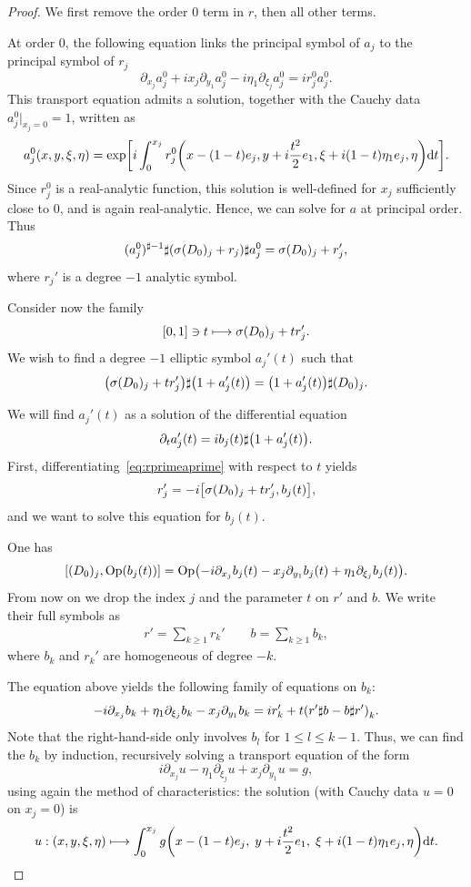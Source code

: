 \documentclass[10pt]{amsart}
\theoremstyle{definition}\newtheorem{defi}[theo]{Definition}\newtheorem{rema}[theo]{Remark}\newtheorem{exam}[theo]{Example}\newtheorem{exem}[theo]{Example}\newtheorem{nota}[theo]{Notation}
\newcommand{\Opp}{\mathrm{Op}}
\newcommand\1{\mathds{1}}
\newcommand{\dd}{\mathrm{d}}
\let\oldmapsto\mapsto
\renewcommand*{\mapsto}{\mathchoice{\longmapsto}{\oldmapsto}{\oldmapsto}{\oldmapsto}}
\let\originalleft\left
\let\originalright\right
\renewcommand{\left}{\mathopen{}\mathclose\bgroup\originalleft}
\renewcommand{\right}{\aftergroup\egroup\originalright}
\begin{document}
\begin{proof}
We first remove the order 0 term in $r$, then all other terms.

At order 0, the following equation links the principal symbol of $a_j$ to the principal symbol of $r_j$
\[
\partial_{x_j}a_j^0+ix_j\partial_{y_1}a_j^0-i\eta_1\partial_{\xi_j}a_j^0=ir_j^0a_j^0.
\]
This transport equation admits a solution, together with the Cauchy data $a_j^0|_{x_j=0}=1$, written as
\[
a_j^0(x,y,\xi,\eta)=\exp\left[i\int_0^{x_j}r_j^0\left(x-(1-t)e_j,y+i\frac{t^2}{2}e_1,\xi+i(1-t)\eta_1e_j,\eta\right)\dd t\right].
\]
Since $r_j^0$ is a real-analytic function, this solution is well-defined for $x_j$ sufficiently close to $0$, and is again real-analytic. Hence, we can solve for $a$ at principal order. Thus
\[
(a^0_j)^{\sharp -1}\sharp \left(\sigma(D_0)_j+r_j\right)\sharp a_j^0=\sigma(D_0)_j+r_j',
\]
where $r_j'$ is a degree $-1$ analytic symbol.

Consider now the family
\[
[0,1]\ni t\mapsto \sigma(D_0)_j+tr_j'.
\]
We wish to find a degree $-1$ elliptic symbol $a_j'(t)$ such that
\begin{equation}\label{eq:rprimeaprime}
\left(\sigma(D_0)_j+tr_j'\right)\sharp\left(1+a_j'(t)\right)=\left(1+a_j'(t)\right)\sharp (D_0)_j.
\end{equation}

We will find $a_j'(t)$ as a solution of the differential equation
\[
\partial_ta_j'(t)=ib_j(t)\sharp\left(1+a_j'(t)\right).
\]
First, differentiating~\eqref{eq:rprimeaprime} with respect to $t$ yields
\[
r_j'=-i\left[\sigma(D_0)_j+tr_j',b_j(t)\right],
\]
and we want to solve this equation for $b_j(t)$.

One has
\begin{equation}\label{eq:exact_conj_D0}
\left[(D_0)_j,\Opp(b_j(t))\right]
=\Opp\left(-i\partial_{x_j}b_j(t)-x_j\partial_{y_1}b_j(t)+\eta_1\partial_{\xi_j}b_j(t)\right).
\end{equation}
From now on we drop the index $j$ and the parameter $t$ on $r'$ and $b$. We write their full symbols as
\begin{align*}
r'=\sum_{k\geq 1} r_k'\qquad b=\sum_{k\geq 1}b_k,
\end{align*}
where $b_k$ and $r_k'$ are homogeneous of degree $-k$.

The equation above yields the following family of equations on $b_k$:
\[
-i\partial_{x_j}b_k +\eta_1\partial_{\xi_j}b_k-x_j\partial_{y_{1}}b_k=ir_k'+t
\left(r'\sharp b-b\sharp r'\right)_k.
\]
Note that the right-hand-side only involves $b_l$ for $1\leq l\leq k-1$. Thus, we can find the $b_k$ by induction, recursively solving a transport equation of the form
\[
i\partial_{x_j}u-\eta_{1}\partial_{\xi_j}u+x_j
\partial_{y_{1}}u=g,
\]
using again the method of characteristics: the solution (with Cauchy data $u=0$ on $x_j=0$) is
\[
u:(x,y,\xi,\eta)\mapsto
\int_0^{x_j}g\left(x-(1-t)e_j,\;y+i\frac{t^2}{2}e_1,\;\xi+i(1-t)\eta_1e_j,\eta\right)\dd t.
\]


\end{proof}
\end{document}

